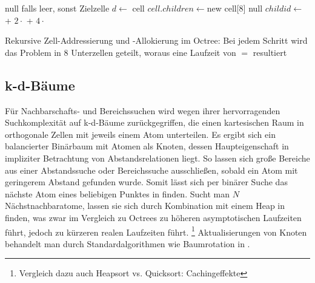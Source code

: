 \begin{algorithm}
  \begin{algorithmic}
    \Result null falls leer, sonst Zielzelle
    \State
    \State $d \gets $
    \State\Return cell
    \EndIf
    \State $cell.children \gets $new cell[8]
    \Else
    \State \Return null
    \EndIf
    \EndIf
    \State $childid \gets $
    + $2\cdot$
    + $4\cdot$
    \State \Return{}
    \EndFunction
  \end{algorithmic}
  \caption[Zell-Addressierung in Octrees]{Rekursive Zell-Addressierung und -Allokierung im Octree: Bei jedem Schritt wird das Problem in 8 Unterzellen geteilt, woraus eine Laufzeit von $=$ resultiert}
  \label{algo:octreeadressing}
\end{algorithm}


\subsection{k-d-Bäume}

Für Nachbarschafts- und Bereichssuchen wird wegen ihrer hervorragenden Suchkomplexität auf k-d-Bäume zurückgegriffen, die einen kartesischen Raum in orthogonale Zellen mit jeweils einem Atom unterteilen.
Es ergibt sich ein balancierter Binärbaum mit Atomen als Knoten, dessen Haupteigenschaft in impliziter Betrachtung von Abstandsrelationen liegt.
So lassen sich große Bereiche aus einer Abstandssuche oder Bereichssuche ausschließen, sobald ein Atom mit geringerem Abstand gefunden wurde.
Somit lässt sich per binärer Suche das nächste Atom eines beliebigen Punktes in  finden.
Sucht man $N$ Nächstnachbaratome, lassen sie sich durch Kombination mit einem Heap in  finden, was zwar im Vergleich zu Octrees zu höheren asymptotischen Laufzeiten führt, jedoch zu kürzeren realen Laufzeiten führt.
\footnote{Vergleich dazu auch Heapsort vs. Quicksort: Cachingeffekte}
Aktualisierungen von Knoten behandelt man durch Standardalgorithmen wie Baumrotation in .

